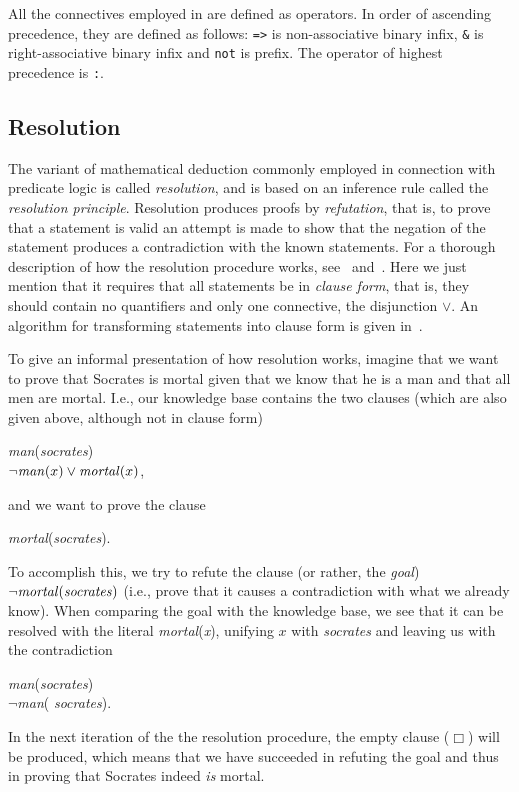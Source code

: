 All the connectives employed in {\niks} are defined as operators. In
order of ascending precedence, they are defined as follows: {\tt =>}
is non-associative binary infix, {\tt \&} is right-associative binary
infix and {\tt not} is prefix. The operator of highest precedence is
{\tt :}.

\subsection{Resolution}
\label{resolution}

The variant of mathematical deduction commonly employed in connection
with predicate logic is called {\em resolution\/}, and is based on an
inference rule called the {\em resolution principle\/}. Resolution
produces proofs by {\em refutation\/}, that is, to prove that a
statement is valid an attempt is made to show that the negation of the
statement produces a contradiction with the known statements. For a
thorough description of how the resolution procedure works,
see~\cite{nilsson} and~\cite{rich}. Here we just mention that it
requires that all statements be in {\em clause form\/}, that is, they
should contain no quantifiers and only one connective, the disjunction
$\vee$. An algorithm for transforming statements into clause form is
given in~\cite{rich}.

To give an informal presentation of how resolution works, imagine that
we want to prove that Socrates is mortal given that we know that he is
a man and that all men are mortal. I.e., our knowledge base contains
the two clauses (which are also given above, although not in clause
form)

\begin{center}
  {\em man\/}({\em socrates\/})\\ $\neg\mbox{\em
  man\/}(x)\vee\mbox{\em mortal\/}(x)$,
\end{center}

\noindent and we want to prove the clause

\begin{center}
  {\em mortal\/}({\em socrates\/}).
\end{center}

\noindent To accomplish this, we try to refute the clause (or rather,
the {\em goal\/}) $\neg\mbox{\em mortal\/}(\mbox{\em socrates\/})$
(i.e., prove that it causes a contradiction with what we already
know). When comparing the goal with the knowledge base, we see that it
can be resolved with the literal {\em mortal\/}({\em x\/}), unifying
$x$ with {\em socrates\/} and leaving us with the contradiction

\begin{center}
  {\em man\/}({\em socrates\/})\\ $\neg${\em man\/}({\em
  socrates\/}).
\end{center}

\noindent In the next iteration of the the resolution procedure, the
empty clause ($\Box$) will be produced, which means that we have
succeeded in refuting the goal and thus in proving that Socrates
indeed {\em is\/} mortal.
